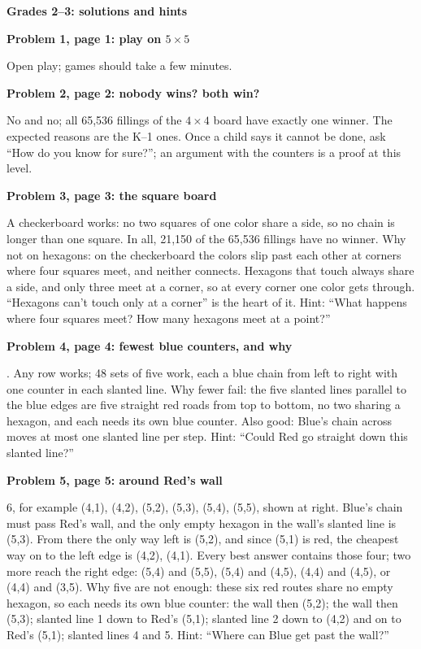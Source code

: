 \documentclass[11pt]{article}
\newcommand{\head}[1]{\par\textbf{\large #1}\par\nopagebreak}
\newcommand{\sub}[1]{\par\textbf{#1}\par\nopagebreak}
\newcommand{\x}{\ensuremath{\times}}
\begin{document}
\head{Grades 2--3: solutions and hints}
\sub{Problem 1, page 1: play on $5\x5$}
Open play; games should take a few minutes.

\sub{Problem 2, page 2: nobody wins? both win?}
No and no; all 65{,}536 fillings of the $4\x4$ board have exactly one winner. The expected reasons are the K--1 ones. Once a child says it cannot be done, ask ``How do you know for sure?''; an argument with the counters is a proof at this level.

\sub{Problem 3, page 3: the square board}
A checkerboard works: no two squares of one color share a side, so no chain is longer than one square. In all, 21{,}150 of the 65{,}536 fillings have no winner. Why not on hexagons: on the checkerboard the colors slip past each other at corners where four squares meet, and neither connects. Hexagons that touch always share a side, and only three meet at a corner, so at every corner one color gets through. ``Hexagons can't touch only at a corner'' is the heart of it. Hint: ``What happens where four squares meet? How many hexagons meet at a point?''

\sub{Problem 4, page 4: fewest blue counters, and why}
5. Any row works; 48 sets of five work, each a blue chain from left to right with one counter in each slanted line. Why fewer fail: the five slanted lines parallel to the blue edges are five straight red roads from top to bottom, no two sharing a hexagon, and each needs its own blue counter. Also good: Blue's chain across moves at most one slanted line per step. Hint: ``Could Red go straight down this slanted line?''

\sub{Problem 5, page 5: around Red's wall}
\vspace{-\baselineskip}\noindent\begin{minipage}[t]{0.70\textwidth}\vspace{0pt}
6, for example (4,1), (4,2), (5,2), (5,3), (5,4), (5,5), shown at right. Blue's chain must pass Red's wall, and the only empty hexagon in the wall's slanted line is (5,3). From there the only way left is (5,2), and since (5,1) is red, the cheapest way on to the left edge is (4,2), (4,1). Every best answer contains those four; two more reach the right edge: (5,4) and (5,5), (5,4) and (4,5), (4,4) and (4,5), or (4,4) and (3,5). Why five are not enough: these six red routes share no empty hexagon, so each needs its own blue counter: the wall then (5,2); the wall then (5,3); slanted line 1 down to Red's (5,1); slanted line 2 down to (4,2) and on to Red's (5,1); slanted lines 4 and 5. Hint: ``Where can Blue get past the wall?''
\end{minipage}\hfill
\begin{minipage}[t]{0.26\textwidth}\vspace{0pt}\centering\end{minipage}
\end{document}
